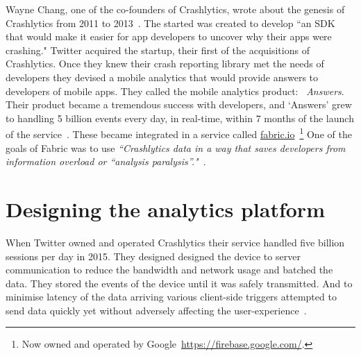 Wayne Chang, one of the co-founders of Crashlytics, wrote about the genesis of Crashlytics from 2011 to 2013~\citep{chang2015_how_six_people_built_crashlytics}. The started was created to develop ``an SDK that would make it easier for app developers to uncover why their apps were crashing." %
Twitter acquired the startup, their first of the acquisitions of Crashlytics. Once they knew their crash reporting library met the needs of developers they devised a mobile analytics that would provide answers to developers of mobile apps. They called the mobile analytics product: ~\emph{Answers}. Their product became a tremendous success with developers, and `Answers' grew to handling 5 billion events every day, in real-time, within 7 months of the launch of the service~\citep{chang2015_how_six_people_built_crashlytics, twitter2015_edsolovey_handling_5B_sessions_a_day_in_real_time}. These became integrated in a service called \href{https://fabric.io}{fabric.io}~\footnote{Now owned and operated by Google~\url{https://firebase.google.com/}.} One of the goals of Fabric was to use \emph{``Crashlytics data in a way that saves developers from information overload or “analysis paralysis”."}~\citep{burke2014_wayne_chang_interview}. 



\section{Designing the analytics platform}
When Twitter owned and operated Crashlytics their service handled five billion sessions per day in 2015. They designed designed the device to server communication to reduce the bandwidth and network usage and batched the data. They stored the events of the device until it was safely transmitted. And to minimise latency of the data arriving various client-side triggers attempted to send data quickly yet without adversely affecting the user-experience~\citep{twitter2015_edsolovey_handling_5B_sessions_a_day_in_real_time}.

